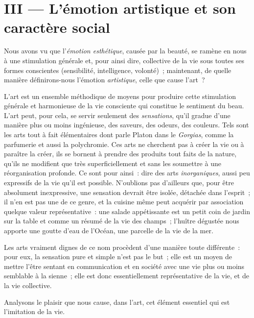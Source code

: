 \documentclass[french,twoside]{book} %
\begin{document}
\section[{III — L’émotion artistique et son caractère social}]{III — L’émotion artistique et son caractère social}
\noindent Nous avons vu que l’\emph{émotion esthétique}, causée par la beauté, se ramène en nous à une stimulation générale et, pour ainsi dire, collective de la vie sous toutes ses formes conscientes (sensibilité, intelligence, volonté) ; maintenant, de quelle manière définirons-nous l’émotion \emph{artistique}, celle que cause l’art ?\par
L’art est un ensemble méthodique de moyens pour produire cette stimulation générale et harmonieuse de la vie consciente qui constitue le sentiment du beau. L’art peut, pour cela, se servir seulement des \emph{sensations}, qu’il gradue d’une manière plus ou moins ingénieuse, des saveurs, des odeurs, des couleurs. Tels sont les arts tout à fait élémentaires dont parle Platon dans le \emph{Gorgias}, comme la parfumerie et aussi la polychromie. Ces arts ne cherchent pas à créer la vie ou à paraître la créer, ils se bornent à prendre des produits tout faits de la nature, qu’ils ne modifient que très superficiellement et sans les soumettre à une réorganisation profonde. Ce sont pour ainsi : dire des arts \emph{inorganiques}, aussi peu expressifs de la vie qu’il est possible. N’oublions pas d’ailleurs que, pour être absolument inexpressive, une sensation devrait être isolée, détachée dans l’esprit ; il n’en est pas une de ce genre, et la cuisine même peut acquérir par association quelque valeur représentative : une salade appétissante est un petit coin de jardin sur la table et comme un résumé de la vie des champs ; l’huître dégustée nous apporte une goutte d’eau de l’Océan, une parcelle de la vie de la mer.\par
Les arts vraiment dignes de ce nom procèdent d’une manière toute différente : pour eux, la sensation pure et simple n’est pas le but ; elle est un moyen de mettre l’être sentant en communication et en société avec une vie plus ou moins semblable à la sienne ; elle est donc essentiellement représentative de la vie, et de la vie collective.\par
Analysons le plaisir que nous cause, dans l’art, cet élément essentiel qui est l’imitation de la vie.\par
\end{document}
